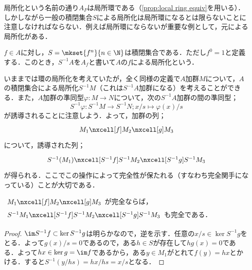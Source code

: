 局所化という名前の通り$A_P$は局所環である（\ref{prop:local ring equiv}を用いる）．しかしながら一般の積閉集合$S$による局所化は局所環になるとは限らないことに注意しなければならない．例えば局所環にならないが重要な例として，元による局所化がある．

\begin{defi}\label{defi:元による局所化}
	$f\in A$に対し，$S=\mkset{f^n}{n\in\N}$は積閉集合である．ただし$f^0=1$と定義する．このとき，$S^{-1}A$を$A_f$と書いて$A$の$f$による局所化という．	
\end{defi}

いままでは環の局所化を考えていたが，全く同様の定義で$A$加群$M$について，$A$の積閉集合による局所化$S^{-1}M$（これは$S^{-1}A$加群になる）を考えることができる．また，$A$加群の準同型$\varphi:M\to N$について，次の$S^{-1}A$加群の間の準同型；
\[S^{-1}\varphi:S^{-1}M\to S^{-1}N;x/s\mapsto \varphi(x)/s\]
が誘導されることに注意しよう．よって，加群の列；
\[\begin{tikzcd}
M_1\nxcell[f]M_2\nxcell[g]M_3
\end{tikzcd}\]
について，誘導された列；
\[\begin{tikzcd}
S^{-1}(M_1)\nxcell[S^{-1}f]S^{-1}M_2\nxcell[S^{-1}g]S^{-1}M_3
\end{tikzcd}\]
が得られる．ここでこの操作によって完全性が保たれる（すなわち完全関手になっている）ことが大切である．

\begin{prop}\label{prop:局所化は完全関手}
	$\begin{tikzcd}
	M_1\nxcell[f]M_2\nxcell[g]M_3
	\end{tikzcd}$が完全ならば，$\begin{tikzcd}
	S^{-1}M_1\nxcell[S^{-1}f]S^{-1}M_2\nxcell[S^{-1}g]S^{-1}M_3
	\end{tikzcd}$も完全である．
\end{prop}
\begin{proof}
	$\im S^{-1}f\subset\ker S^{-1}g$は明らかなので，逆を示す．任意の$x/s\in\ker S^{-1}g$をとる．よって$g(x)/s=0$であるので，ある$h\in S$が存在して$hg(x)=0$である．よって$hx\in\ker g=\im f$であるから，ある$y\in M_1$がとれて$f(y)=hx$とかける．すると$S^{-1}(y/hs)=hx/hs=x/s$となる．
\end{proof}

